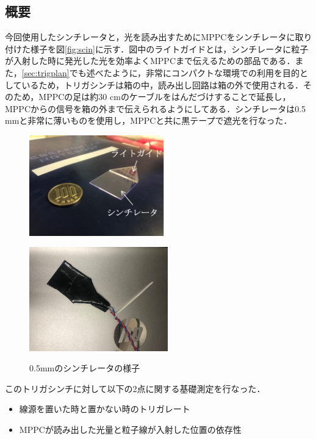 \subsection{概要}
今回使用したシンチレータと，光を読み出すためにMPPCをシンチレータに取り付けた様子を図\ref{fig:scin}に示す．図中のライトガイドとは，シンチレータに粒子が入射した時に発光した光を効率よくMPPCまで伝えるための部品である．また，\ref{sec:trigplan}でも述べたように，非常にコンパクトな環境での利用を目的としているため，トリガシンチは箱の中，読み出し回路は箱の外で使用される．そのため，MPPCの足は約30 $\mathrm{cm}$のケーブルをはんだづけすることで延長し，MPPCからの信号を箱の外まで伝えられるようにしてある．シンチレータは0.5 $\mathrm{mm}$と非常に薄いものを使用し，MPPCと共に黒テープで遮光を行なった．

\begin{figure}[h]
  \centering
  \begin{minipage}[b]{0.45\linewidth}
    \centering
    \includegraphics[width=6cm]{./figure/trigscin.png}
    \label{fig:scin}
  \end{minipage}
  \begin{minipage}[b]{0.45\linewidth}
    \centering
    \includegraphics[width=6cm]{./figure/trigscin1.png}
    \label{fig:trigscin}
  \end{minipage}
  \caption{0.5mmのシンチレータの様子}
  \label{fig:trigscin1}
\end{figure}


このトリガシンチに対して以下の2点に関する基礎測定を行なった．
\begin{itemize}
\item 線源を置いた時と置かない時のトリガレート 
\item MPPCが読み出した光量と粒子線が入射した位置の依存性
\end{itemize}

